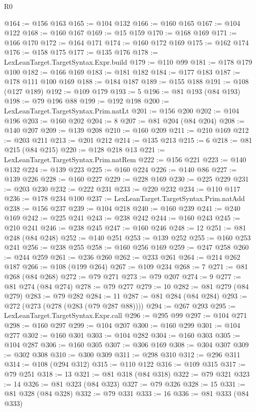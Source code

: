 \begin{lexlean}{R0}
\begin{coremodule}
@164 := @156 @163
@165 := @104 @132
@166 := @160 @165
@167 := @104 @122
@168 := @160 @167
@169 := @15 @159
@170 := @168 @169
@171 := @166 @170
@172 := @164 @171
@174 := @160 @172 @169
@175 := @162 @174
@176 := @158 @175
@177 := @135 @176
@178 := LexLeanTarget.TargetSyntax.Expr.build
@179 := @110 @99
@181 := @178 @179 @100
@182 := @166 @169
@183 := @181 @182
@184 := @177 @183
@187 := @178 @111 @100 @169
@188 := @184 @187
@189 := @155 @188
@191 := @108 (@127 @189)
@192 := @109 @179
@193 := 5
@196 := @81 @193 (@84 @193)
@198 := @79 @196 @88
@199 := @192 @198
@200 := LexLeanTarget.TargetSyntax.Prim.natLt
@201 := @156 @200
@202 := @104 @196
@203 := @160 @202
@204 := 8
@207 := @81 @204 (@84 @204)
@208 := @140 @207
@209 := @139 @208
@210 := @160 @209
@211 := @210 @169
@212 := @203 @211
@213 := @201 @212
@214 := @135 @213
@215 := 6
@218 := @81 @215 (@84 @215)
@220 := @128 @218 @13
@221 := LexLeanTarget.TargetSyntax.Prim.natRem
@222 := @156 @221
@223 := @140 @132
@224 := @139 @223
@225 := @160 @224
@226 := @140 @86
@227 := @139 @226
@228 := @160 @227
@229 := @228 @169
@230 := @225 @229
@231 := @203 @230
@232 := @222 @231
@233 := @220 @232
@234 := @110 @117
@236 := @178 @234 @100
@237 := LexLeanTarget.TargetSyntax.Prim.natAdd
@238 := @156 @237
@239 := @104 @218
@240 := @160 @239
@241 := @240 @169
@242 := @225 @241
@243 := @238 @242
@244 := @160 @243
@245 := @210 @241
@246 := @238 @245
@247 := @160 @246
@248 := 12
@251 := @81 @248 (@84 @248)
@252 := @140 @251
@253 := @139 @252
@255 := @160 @253 @241
@256 := @238 @255
@258 := @160 @256 @169
@259 := @247 @258
@260 := @244 @259
@261 := @236 @260
@262 := @233 @261
@264 := @214 @262 @187
@266 := @108 (@199 @264)
@267 := @109 @234
@268 := 7
@271 := @81 @268 (@84 @268)
@272 := @79 @271
@273 := @79 @207
@274 := 9
@277 := @81 @274 (@84 @274)
@278 := @79 @277
@279 := 10
@282 := @81 @279 (@84 @279)
@283 := @79 @282
@284 := 11
@287 := @81 @284 (@84 @284)
@293 := @272 (@273 (@278 (@283 (@79 @287 @88))))
@294 := @267 @293
@295 := LexLeanTarget.TargetSyntax.Expr.call
@296 := @295 @99
@297 := @104 @271
@298 := @160 @297
@299 := @104 @207
@300 := @160 @299
@301 := @104 @277
@302 := @160 @301
@303 := @104 @282
@304 := @160 @303
@305 := @104 @287
@306 := @160 @305
@307 := @306 @169
@308 := @304 @307
@309 := @302 @308
@310 := @300 @309
@311 := @298 @310
@312 := @296 @311
@314 := @108 (@294 @312)
@315 := @110 @122
@316 := @109 @315
@317 := @79 @251
@318 := 13
@321 := @81 @318 (@84 @318)
@322 := @79 @321
@323 := 14
@326 := @81 @323 (@84 @323)
@327 := @79 @326
@328 := 15
@331 := @81 @328 (@84 @328)
@332 := @79 @331
@333 := 16
@336 := @81 @333 (@84 @333)

\end{coremodule}
\end{lexlean}
